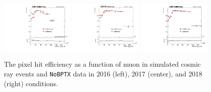 \begin{figure}
\centering
\includegraphics[width=0.32\textwidth]{figures/systematics/muon_pixel_hit_eff/muonAbsD0_100000um_variableBins_coarse_2016.pdf}
\includegraphics[width=0.32\textwidth]{figures/systematics/muon_pixel_hit_eff/muonAbsD0_100000um_variableBins_coarse_2017.pdf}
\includegraphics[width=0.32\textwidth]{figures/systematics/muon_pixel_hit_eff/muonAbsD0_100000um_variableBins_coarse_2018.pdf}
\caption{The pixel hit efficiency as a function of muon \ad in simulated cosmic ray events and \texttt{NoBPTX} data in 2016 (left), 2017 (center), and 2018 (right) conditions.}
\label{muon_pixel_hit_eff}
\end{figure}